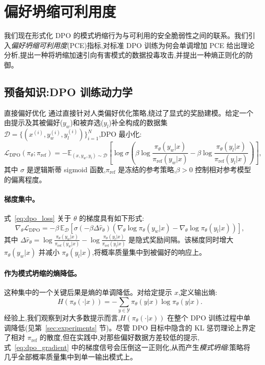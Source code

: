 \section{偏好坍缩可利用度}
\label{sec:method}

我们现在形式化 DPO 的模式坍缩行为与可利用的安全脆弱性之间的联系。我们引入\emph{偏好坍缩可利用度}(PCE)指标,对标准 DPO 训练为何会单调增加 PCE 给出理论分析,提出一种将坍缩加速引向有害模式的数据投毒攻击,并提出一种熵正则化的防御。

\subsection{预备知识:DPO 训练动力学}
\label{sec:preliminaries}

直接偏好优化 \citep{rafailov2023dpo} 通过直接针对人类偏好优化策略,绕过了显式的奖励建模。给定一个由提示及其被偏好($y_w$)和被弃选($y_l$)补全构成的数据集 $\mathcal{D} = \{(x^{(i)}, y_w^{(i)}, y_l^{(i)})\}_{i=1}^N$,DPO 最小化:
\begin{equation}
\label{eq:dpo_loss}
\mathcal{L}_{\text{DPO}}(\pi_\theta; \pi_{\text{ref}}) = -\mathbb{E}_{(x,y_w,y_l)\sim\mathcal{D}} \left[\log \sigma\!\left(\beta \log \frac{\pi_\theta(y_w|x)}{\pi_{\text{ref}}(y_w|x)} - \beta \log \frac{\pi_\theta(y_l|x)}{\pi_{\text{ref}}(y_l|x)}\right)\right],
\end{equation}
其中 $\sigma$ 是逻辑斯蒂 sigmoid 函数,$\pi_{\text{ref}}$ 是冻结的参考策略,$\beta > 0$ 控制相对参考模型的偏离程度。

\paragraph{梯度集中。} 式~\eqref{eq:dpo_loss} 关于 $\theta$ 的梯度具有如下形式:
\begin{equation}
\label{eq:dpo_gradient}
\nabla_\theta \mathcal{L}_{\text{DPO}} = -\beta\, \mathbb{E}_{\mathcal{D}}\!\left[\sigma(-\beta \Delta\hat{r}_\theta)\left(\nabla_\theta \log \pi_\theta(y_w|x) - \nabla_\theta \log \pi_\theta(y_l|x)\right)\right],
\end{equation}
其中 $\Delta\hat{r}_\theta = \log \frac{\pi_\theta(y_w|x)}{\pi_{\text{ref}}(y_w|x)} - \log \frac{\pi_\theta(y_l|x)}{\pi_{\text{ref}}(y_l|x)}$ 是隐式奖励间隔。该梯度同时增大 $\pi_\theta(y_w|x)$ 并减小 $\pi_\theta(y_l|x)$,将概率质量集中到被偏好的响应上。

\paragraph{作为模式坍缩的熵降低。} 这种集中的一个关键后果是熵的单调降低。对给定提示 $x$,定义输出熵:
\begin{equation}
H(\pi_\theta(\cdot|x)) = -\sum_{y \in \mathcal{Y}} \pi_\theta(y|x) \log \pi_\theta(y|x).
\end{equation}
经验上,我们观察到对大多数提示而言,$H(\pi_\theta(\cdot|x))$ 在整个 DPO 训练过程中单调降低(见第~\ref{sec:experiments} 节)。尽管 DPO 目标中隐含的 KL 惩罚理论上界定了相对 $\pi_{\text{ref}}$ 的散度,但在实践中,对那些偏好数据方差较低的提示,式~\eqref{eq:dpo_gradient} 中的梯度信号会压倒这一正则化,从而产生\emph{模式坍缩}:策略将几乎全部概率质量集中到单一输出模式上。

